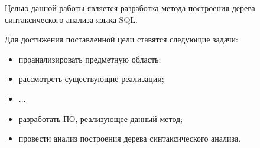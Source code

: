 \Introduction



Целью данной работы является разработка метода построения дерева синтаксического
анализа языка SQL. %

Для достижения поставленной цели ставятся следующие задачи:

\begin{itemize}
	\item проанализировать предметную область;
	\item рассмотреть существующие реализации;
	\item ...
	\item разработать ПО, реализующее данный метод;
	\item провести анализ построения дерева синтаксического анализа.
\end{itemize}